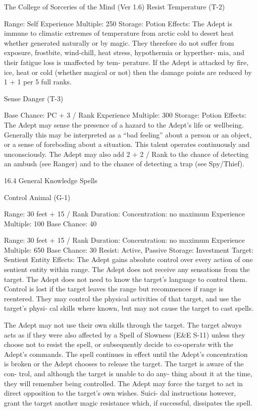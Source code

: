 \begin{Chapter}{The College of Sorceries of the Mind (Ver 1.6)}
Resist Temperature (T-2) 

Range: Self 
Experience Multiple: 250 
Storage: Potion 
Effects: The Adept is immune to climatic extremes 
of  temperature  from  arctic  cold  to  desert  heat 
whether  generated  naturally  or  by  magic.  They 
therefore  do  not  suffer  from  exposure,  frostbite, 
wind-chill,  heat  stress,  hypothermia  or  hyperther-
mia,  and  their  fatigue  loss  is  unaffected  by  tem-
perature.  If  the  Adept  is  attacked by  fire,  ice,  heat 
or  cold  (whether  magical  or  not)  then  the  damage 
points are reduced by 1 + 1 per 5 full ranks. 

Sense Danger (T-3) 

Base Chance: PC + 3 / Rank 
Experience Multiple: 300 
Storage: Potion 
Effects:  The  Adept  may  sense  the  presence  of  a 
hazard  to  the  Adept’s  life  or  wellbeing.  Generally 
this  may  be  interpreted  as  a  “bad  feeling”  about  a 
person or an object, or a sense of foreboding about 
a  situation.  This  talent  operates  continuously  and 
unconsciously.  The  Adept  may  also  add  2  +  2  / 
Rank  to  the  chance  of  detecting  an  ambush  (see 
Ranger)  and  to  the  chance  of  detecting  a  trap  (see 
Spy/Thief). 

16.4 General Knowledge Spells 

Control Animal (G-1) 

Range: 30 feet + 15 / Rank 
Duration: Concentration: no maximum 
Experience Multiple: 100 
Base Chance: 40%

Range: 30 feet + 15 / Rank 
Duration: Concentration: no maximum 
Experience Multiple: 650 
Base Chance: 30%
Resist: Active, Passive 
Storage: Investment 
Target: Sentient Entity 
Effects:  The  Adept  gains  absolute  control  over 
every  action  of  one  sentient  entity  within  range. 
The  Adept  does  not  receive  any  sensations  from 
the  target.  The  Adept  does  not  need  to  know  the 
target’s language to control them. Control is lost if 
the  target  leaves  the  range  but  recommences  if 
range  is  reentered.  They  may  control  the  physical 
activities  of  that target, and use the target’s  physi-
cal  skills  where  known,  but  may  not  cause  the 
target to cast spells. 

The Adept may not use their own skills through the 
target.  The  target  always  acts  as  if  they  were  also 
affected by a Spell of Slowness (E\&E S-11) unless 
they choose not to resist the spell, or subsequently 
decide  to  co-operate  with  the  Adept’s  commands. 
The  spell  continues  in  effect  until  the  Adept’s 
concentration  is  broken  or  the  Adept  chooses  to 
release  the  target.  The  target  is  aware  of  the  con-
trol,  and  although  the  target  is  unable  to  do  any-
thing about it at the time, they will remember being 
controlled. The Adept may force the target to act in 
direct opposition to the target’s own wishes. Suici-
dal  instructions  however,  grant  the  target  another 
magic resistance which, if successful, dissipates the 
spell. 


\end{Chapter}
